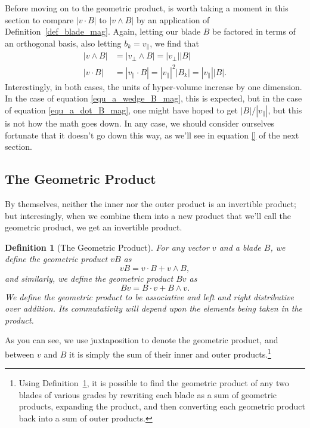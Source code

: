 \documentclass[12pt]{article}
\numberwithin{equation}{section}
\newtheorem{definition}{Definition}[section]
\begin{document}
Before moving on to the geometric product, is worth taking a moment in this section
to compare $|v\cdot B|$ to $|v\wedge B|$ by an application of Definition~\ref{def_blade_mag}.
Again, letting our blade $B$ be factored in terms of an orthogonal basis, also letting $b_k=v_{\parallel}$,
we find that
\begin{align}
|v\wedge B|&=|v_{\perp}\wedge B|=|v_{\perp}||B|\label{equ_a_wedge_B_mag} \\
|v\cdot B|&=|v_{\parallel}\cdot B|=|v_{\parallel}|^2|B_k|=|v_{\parallel}||B|.\label{equ_a_dot_B_mag}
\end{align}
Interestingly, in both cases, the units of hyper-volume increase by one dimension.  In the
case of equation \eqref{equ_a_wedge_B_mag}, this is expected, but in the case of
equation \eqref{equ_a_dot_B_mag}, one might have hoped to get $|B|/|v_{\parallel}|$,
but this is not how the math goes down.  In any case, we should consider ourselves fortunate
that it doesn't go down this way, as we'll see in equation \eqref{} of the next section.



\subsection{The Geometric Product}

By themselves, neither the inner nor the outer product is an invertible
product; but interesingly, when we combine them into a new product that
we'll call the geometric product, we get an invertible product.
\begin{definition}[The Geometric Product]\label{def_vec_blade_geo_prod}
For any vector $v$ and a blade $B$, we define the geometric product $vB$ as
\begin{equation}
vB = v\cdot B + v\wedge B,
\end{equation}
and similarly, we define the geometric product $Bv$ as
\begin{equation}
Bv = B\cdot v + B\wedge v.
\end{equation}
We define the geometric product to be associative and left and right distributive
over addition.  Its commutativity will depend upon the elements being taken in the product.
\end{definition}
As you can see, we use juxtaposition to denote the geometric product, and
between $v$ and $B$ it is simply the sum of their inner and outer products.\footnote{Using
Definition~\ref{def_vec_blade_geo_prod}, it is possible to find the geometric
product of any two blades of various grades by rewriting each blade as a sum of geometric products,
expanding the product, and then converting each geometric product back into a
sum of outer products.}








\end{document}
